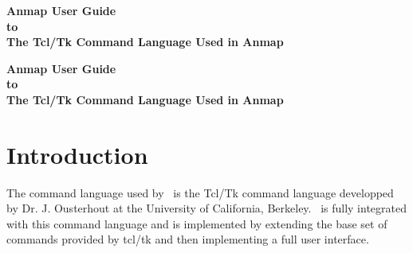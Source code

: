 

\begin{center}
\vspace*{4.0cm}
{\Large\bf Anmap User Guide} \\
\vspace{1.0cm}
{\large\bf to} \\
\vspace{1.0cm}
{\Large\bf The Tcl/Tk Command Language Used in Anmap}
\end{center}

\newpage
\begin{center}
{\Large\bf Anmap User Guide} \\
\vspace{1.0cm}
{\large\bf to} \\
\vspace{1.0cm}
{\Large\bf The Tcl/Tk Command Language Used in Anmap}
\end{center}

\section{Introduction}

The command language used by \Anmap\ is the Tcl/Tk command language
developped by Dr. J. Ousterhout at the University of California, Berkeley.
\Anmap\ is fully integrated with this command language and is implemented
by extending the base set of commands provided by tcl/tk and then
implementing a full user interface.










